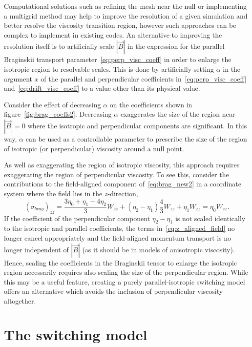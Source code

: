 Computational solutions such as refining the mesh near the null or implementing a multigrid method may help to improve the resolution of a given simulation and better resolve the viscosity transition region, however such approaches can be complex to implement in existing codes. An alternative to improving the resolution itself is to artificially scale $|\vec{B}|$ in the expression for the parallel Braginskii transport parameter~\eqref{eq:perp_visc_coeff} in order to enlarge the isotropic region to resolvable scales. This is done by artificially setting $\alpha$ in the argument $x$ of the parallel and perpendicular coefficients in~\eqref{eq:perp_visc_coeff} and~\eqref{eq:drift_visc_coeff} to a value other than its physical value.

Consider the effect of decreasing $\alpha$ on the coefficients shown in figure~\ref{fig:brag_coeffs2}. Decreasing $\alpha$ exaggerates the size of the region near $|\vec{B}| = 0$ where the isotropic and perpendicular components are significant. In this way, $\alpha$ can be used as a controllable parameter to prescribe the size of the region of isotropic (or perpendicular) viscosity around a null point.

As well as exaggerating the region of isotropic viscosity, this approach requires exaggerating the region of perpendicular viscosity. To see this, consider the contributions to the field-aligned component of~\eqref{eq:brag_new2} in a coordinate system where the field lies in the $z$-direction,
\begin{equation}
  \label{eq:z_aligned_field}
(\sigma_{brag})_{zz} = \frac{3\eta_0+\eta_1-4\eta_2}{3} W_{zz} + (\eta_2 - \eta_1) \frac{4}{3} W_{zz} + \eta_1 W_{zz} = \eta_0 W_{zz}.
\end{equation}
If the coefficient of the perpendicular component $\eta_2 - \eta_1$ is not scaled identically to the isotropic and parallel coefficients, the terms in~\eqref{eq:z_aligned_field} no longer cancel appropriately and the field-aligned momentum transport is no longer independent of $|\vec{B}|$ (as it should be in models of anisotropic viscosity). Hence, scaling the coefficients in the Braginskii tensor to enlarge the isotropic region necessarily requires also scaling the size of the perpendicular region. While this may be a useful feature, creating a purely parallel-isotropic switching model offers an alternative which avoids the inclusion of perpendicular viscosity altogether.

\section{The switching model}


